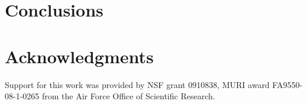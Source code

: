 \section{Conclusions}
\label{concl}

\section{Acknowledgments}
Support for this work was provided by NSF grant 0910838, MURI award FA9550-08-1-0265 from the Air Force Office of Scientific Research.

%
%
